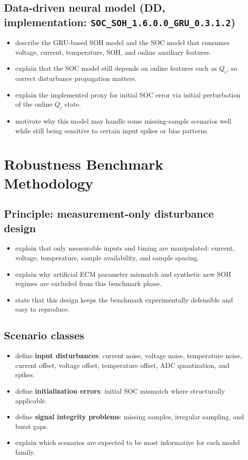 \documentclass[review,nopreprintline]{elsarticle}
\begin{document}
\subsection{Data-driven neural model (DD, implementation: \texttt{SOC\_SOH\_1.6.0.0\_GRU\_0.3.1.2})}
\begin{itemize}[leftmargin=*]
    \item describe the GRU-based SOH model and the SOC model that consumes voltage, current, temperature, SOH, and online auxiliary features.
    \item explain that the SOC model still depends on online features such as $Q_c$, so correct disturbance propagation matters.
    \item explain the implemented proxy for initial SOC error via initial perturbation of the online $Q_c$ state.
    \item motivate why this model may handle some missing-sample scenarios well while still being sensitive to certain input spikes or bias patterns.
\end{itemize}

\section{Robustness Benchmark Methodology}
\subsection{Principle: measurement-only disturbance design}
\begin{itemize}[leftmargin=*]
    \item explain that only measurable inputs and timing are manipulated: current, voltage, temperature, sample availability, and sample spacing.
    \item explain why artificial ECM parameter mismatch and synthetic new SOH regimes are excluded from this benchmark phase.
    \item state that this design keeps the benchmark experimentally defensible and easy to reproduce.
\end{itemize}

\subsection{Scenario classes}
\begin{itemize}[leftmargin=*]
    \item define \textbf{input disturbances}: current noise, voltage noise, temperature noise, current offset, voltage offset, temperature offset, ADC quantization, and spikes.
    \item define \textbf{initialization errors}: initial SOC mismatch where structurally applicable.
    \item define \textbf{signal integrity problems}: missing samples, irregular sampling, and burst gaps.
    \item explain which scenarios are expected to be most informative for each model family.
\end{itemize}
\end{document}

